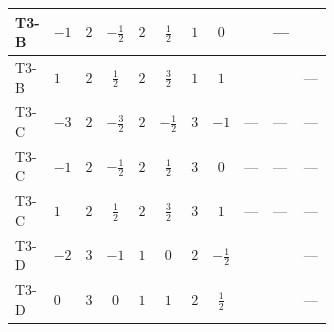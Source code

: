 \documentclass[8pt]{article}
\begin{document}
\begin{landscape}
\begin{longtable}{@{}llcccccc >{\raggedright\arraybackslash}p{0.21\linewidth} >{\raggedright\arraybackslash}p{0.21\linewidth} >{\raggedright\arraybackslash}p{0.21\linewidth}@{}}
\midrule
T3-B & $-1$ & $2$ & $-\frac{1}{2}$ & $2$ & $\frac{1}{2}$ & $1$ & $0$ & \scriptsize\adjustbox{max width=\linewidth}{$\begin{gathered} +T_{\nu}^{(1)} \left({y_1}\right)_{ij}\end{gathered}$} & --- & \scriptsize\adjustbox{max width=\linewidth}{$\begin{gathered} \operatorname{Tr}\!\left({y_1}\,\left({y_2}\right)^{\dagger}\right) \left({y_2}\right)_{ij}\end{gathered}$} \\
\midrule
T3-B & $1$ & $2$ & $\frac{1}{2}$ & $2$ & $\frac{3}{2}$ & $1$ & $1$ & \scriptsize\adjustbox{max width=\linewidth}{$\begin{gathered} T_{\nu}^{(1)} \left({y_1}\right)_{ij}\end{gathered}$} & \scriptsize\adjustbox{max width=\linewidth}{$\begin{gathered} +\frac{1}{2} (\left({y_2}\,\left({y_2}\right)^{\dagger}\,{y_1}\right)_{ij}+\left({Y_e}\,\left({Y_e}\right)^{\dagger}\,{y_1}\right)_{ij}+3 \left({y_1}\,\left({y_1}\right)^{\dagger}\,{y_1}\right)_{ij})\end{gathered}$} & --- \\
\midrule
T3-C & $-3$ & $2$ & $-\frac{3}{2}$ & $2$ & $-\frac{1}{2}$ & $3$ & $-1$ & --- & --- & --- \\
\midrule
T3-C & $-1$ & $2$ & $-\frac{1}{2}$ & $2$ & $\frac{1}{2}$ & $3$ & $0$ & --- & --- & --- \\
\midrule
T3-C & $1$ & $2$ & $\frac{1}{2}$ & $2$ & $\frac{3}{2}$ & $3$ & $1$ & --- & --- & --- \\
\midrule
T3-D & $-2$ & $3$ & $-1$ & $1$ & $0$ & $2$ & $-\frac{1}{2}$ & \scriptsize\adjustbox{max width=\linewidth}{$\begin{gathered} T_{\nu}^{(1)} \left({y_1}\right)_{ij}\end{gathered}$} & \scriptsize\adjustbox{max width=\linewidth}{$\begin{gathered} +\frac{1}{2} (\left({y_2}\,\left({y_2}\right)^{\dagger}\,{y_1}\right)_{ij}+\left({Y_e}\,\left({Y_e}\right)^{\dagger}\,{y_1}\right)_{ij}+3 \left({y_1}\,\left({y_1}\right)^{\dagger}\,{y_1}\right)_{ij})\end{gathered}$} & --- \\
\midrule
T3-D & $0$ & $3$ & $0$ & $1$ & $1$ & $2$ & $\frac{1}{2}$ & \scriptsize\adjustbox{max width=\linewidth}{$\begin{gathered} T_{\nu}^{(1)} \left({y_1}\right)_{ij}\end{gathered}$} & \scriptsize\adjustbox{max width=\linewidth}{$\begin{gathered} +\frac{1}{2} (\left({y_2}\,\left({y_2}\right)^{\dagger}\,{y_1}\right)_{ij}+\left({Y_e}\,\left({Y_e}\right)^{\dagger}\,{y_1}\right)_{ij}+3 \left({y_1}\,\left({y_1}\right)^{\dagger}\,{y_1}\right)_{ij})\end{gathered}$} & --- \\

\end{longtable}
\end{landscape}
\end{document}
